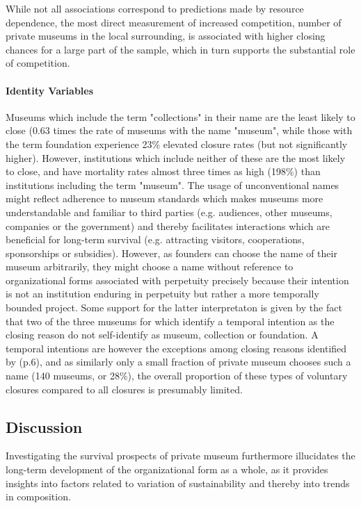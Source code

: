 \documentclass[12pt]{article}
\begin{document}
While not all associations correspond to predictions made by resource dependence, the most direct measurement of increased competition, number of private museums in the local surrounding, is associated with higher closing chances for a large part of the sample, which in turn supports the substantial role of competition.
\paragraph*{Identity Variables}


Museums which include the term "collections" in their name are the least likely to close (0.63 times the rate of museums with the name "museum", while those with the term foundation experience 23\% elevated closure rates (but not significantly higher).
However, institutions which include neither of these are the most likely to close, and have mortality rates almost three times as high (198\%) than institutions including the term "museum".
The usage of unconventional names might reflect adherence to museum standards which makes museums more understandable and familiar to third parties (e.g. audiences, other museums, companies or the government) and thereby facilitates interactions which are beneficial for long-term survival (e.g. attracting visitors, cooperations, sponsorships or subsidies).
However, as founders can choose the name of their museum arbitrarily, they might choose a name without reference to organizational forms associated with perpetuity precisely because their intention is not an institution enduring in perpetuity but rather a more temporally bounded project.
Some support for the latter interpretaton is given by the fact that two of the three museums for which \textcite{Velthuis_Gera_2024_fragility} identify a temporal intention as the closing reason do not self-identify as museum, collection or foundation.
A temporal intentions are however the exceptions among closing reasons identified by \textcite{Velthuis_Gera_2024_fragility} (p.6), and as similarly only a small fraction of private museum chooses such a name (140 museums, or 28\%), the overall proportion of these types of voluntary closures compared to all closures is presumably limited.
\subsection*{Discussion}



Investigating the survival prospects of private museum furthermore illucidates the long-term development of the organizational form as a whole, as it provides insights into factors related to variation of sustainability and thereby into trends in composition. 
\end{document}
